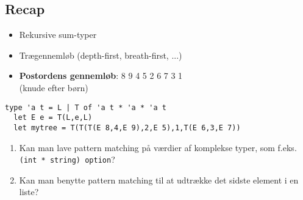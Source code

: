 \documentclass[rgb]{beamer}
\begin{document}

\subsection{Recap}

\begin{frame}[fragile]
\begin{footnotesize}

  \begin{minipage}{.7\textwidth}

  \begin{itemize}
  \item Rekursive sum-typer
  \item Trægennemløb (depth-first, breath-first, ...)
  \item \textbf{Postordens gennemløb}:  8 9 4 5 2 6 7 3 1 \\
        (knude efter børn)
  \end{itemize}
  \end{minipage}
  \begin{minipage}{.25\textwidth}
  \end{minipage}

\begin{lstlisting}[numbers=none,frame=none,mathescape]
  type 'a t = L | T of 'a t * 'a * 'a t
  let E e = T(L,e,L)
  let mytree = T(T(T(E 8,4,E 9),2,E 5),1,T(E 6,3,E 7))
\end{lstlisting}


  \vspace{2mm}

  \begin{enumerate}

  \item Kan man lave pattern matching på værdier af komplekse typer,
    som f.eks. \lstinline{(int * string) option}?

  \item Kan man benytte pattern matching til at udtrække det sidste
    element i en liste?
  \end{enumerate}
\end{footnotesize}
\end{frame}
\end{document}

